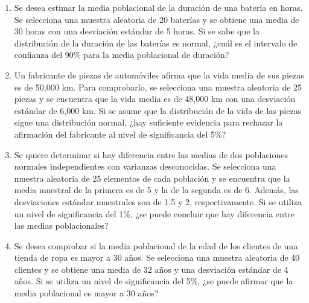 \begin{Ejer}
\begin{enumerate}
    \item Se desea estimar la media poblacional de la duración de una batería en horas. Se selecciona una muestra aleatoria de 20 baterías y se obtiene una media de 30 horas con una desviación estándar de 5 horas. Si se sabe que la distribución de la duración de las baterías es normal, ¿cuál es el intervalo de confianza del 90\% para la media poblacional de duración?
    \item Un fabricante de piezas de automóviles afirma que la vida media de sus piezas es de 50{,}000 km. Para comprobarlo, se selecciona una muestra aleatoria de 25 piezas y se encuentra que la vida media es de 48{,}000 km con una desviación estándar de 6{,}000 km. Si se asume que la distribución de la vida de las piezas sigue una distribución normal, ¿hay suficiente evidencia para rechazar la afirmación del fabricante al nivel de significancia del 5\%?
    \item Se quiere determinar si hay diferencia entre las medias de dos poblaciones normales independientes con varianzas desconocidas. Se selecciona una muestra aleatoria de 25 elementos de cada población y se encuentra que la media muestral de la primera es de 5 y la de la segunda es de 6. Además, las desviaciones estándar muestrales son de 1.5 y 2, respectivamente. Si se utiliza un nivel de significancia del 1\%, ¿se puede concluir que hay diferencia entre las medias poblacionales?
    \item Se desea comprobar si la media poblacional de la edad de los clientes de una tienda de ropa es mayor a 30 años. Se selecciona una muestra aleatoria de 40 clientes y se obtiene una media de 32 años y una desviación estándar de 4 años. Si se utiliza un nivel de significancia del 5\%, ¿se puede afirmar que la media poblacional es mayor a 30 años?


\end{enumerate}
\end{Ejer}
